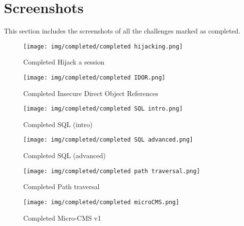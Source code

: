 \documentclass{article}
\begin{document}
\section{Screenshots}
This section includes the screenshots of all the challenges marked as completed.
\begin{figure}[H]
    \centering
    \texttt{[image: img/completed/completed hijacking.png]}
    \caption{Completed Hijack a session}
    \label{fig:chas}
\end{figure}
\begin{figure}[H]
    \centering
    \texttt{[image: img/completed/completed IDOR.png]}
    \caption{Completed Insecure Direct Object References}
    \label{fig:cidor}
\end{figure}
\begin{figure}[H]
    \centering
    \texttt{[image: img/completed/completed SQL intro.png]}
    \caption{Completed SQL (intro)}
    \label{fig:csqli}
\end{figure}
\begin{figure}[H]
    \centering
    \texttt{[image: img/completed/completed SQL advanced.png]}
    \caption{Completed SQL (advanced)}
    \label{fig:csqla}
\end{figure}
\begin{figure}[H]
    \centering
    \texttt{[image: img/completed/completed path traversal.png]}
    \caption{Completed Path traversal}
    \label{fig:cpt}
\end{figure}
\begin{figure}[H]
    \centering
    \texttt{[image: img/completed/completed microCMS.png]}
    \caption{Completed Micro-CMS v1}
    \label{fig:cmcms1}
\end{figure}
\end{document}
